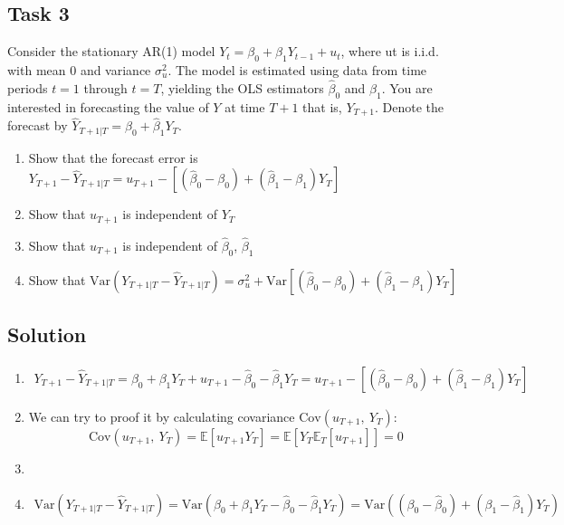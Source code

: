 \documentclass[10pt,a4paper]{amsart}
\newcommand{\E}{\mathbb{E}}
\newcommand{\V}{\text{Var}}
\newcommand{\C}{\text{Cov}}
\begin{document}
\subsection*{Task 3}
Consider the stationary AR(1) model $ Y_t = \beta_0 + \beta_1 Y_{t-1} + u_t $, where ut is i.i.d.
with mean $ 0 $ and variance $ \sigma^{2}_u $. The model is estimated using data from time periods
$ t=1 $ through $ t = T $, yielding the OLS estimators $ \hat\beta_{0} $ and $ \hat\beta_{1} $.
You are interested in forecasting the value of $ Y $ at time $ T + 1 $  that is, $ Y_{T +1} $.
Denote the forecast by $ \hat{Y}_{T+1|T} = \hat\beta_0 + \hat\beta_1 Y_T $.
\begin{enumerate}
    \item Show that the forecast error is $ Y_{T+1} - \hat{Y}_{T+1 | T} = u_{T+1} - \left[ (\hat\beta_0 - \beta_0) + (\hat\beta_1 - \beta_1)Y_T \right]  $
    \item Show that $ u_{T+1} $ is independent of $ Y_{T} $
    \item Show that $ u_{T+1} $ is independent of $ \hat\beta_0 $, $ \hat\beta_1 $
    \item Show that $ \V(Y_{T+1 | T} - \hat{Y}_{T+1 | T}) = \sigma^{2}_u + \V \left[ (\hat\beta_0 - \beta_0) + (\hat\beta_1 - \beta_1)Y_T  \right] $
\end{enumerate}

\subsection*{Solution}
\begin{enumerate}
    \item
          \begin{gather*}
              Y_{T+1} - \hat{Y}_{T+1 | T} = \beta_0 + \beta_1 Y_T + u_{T+1} - \hat{\beta}_0 - \hat{\beta}_1 Y_T
              = u_{T+1} - \left[ (\hat\beta_0 - \beta_0) + (\hat\beta_1 - \beta_1)Y_T \right]
          \end{gather*}
    \item We can try to proof it by calculating covariance $ \C (u_{T+1}, ~ Y_T)$:
          \[\C (u_{T+1}, ~ Y_T) = \E \left[ u_{T+1} Y_T \right]  = \E \left[ Y_T \E_{T} \left[ u_{T+1} \right] \right] = 0 \]
    \item 
    \item 
    \begin{gather*}
        \V(Y_{T+1 | T} - \hat{Y}_{T+1 | T})  = \V \left( \beta_0 + \beta_1 Y_T - \hat\beta_0 - \hat\beta_1Y_T \right)
        = \V \left(
             (\beta_0 - \hat{\beta}_0) + (\beta_1 - \hat\beta_1)Y_T
              \right)
    \end{gather*}
\end{enumerate}
\end{document}
